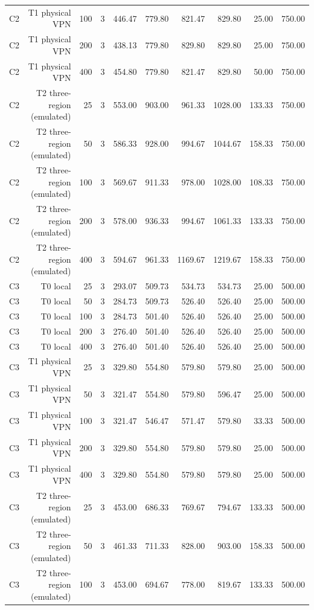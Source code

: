 \begin{table}[t]
\begin{tabular}{lrrrrrrrrr}
C2 & T1 physical VPN & 100 & 3 & 446.47 & 779.80 & 821.47 & 829.80 & 25.00 & 750.00 \\
C2 & T1 physical VPN & 200 & 3 & 438.13 & 779.80 & 829.80 & 829.80 & 25.00 & 750.00 \\
C2 & T1 physical VPN & 400 & 3 & 454.80 & 779.80 & 821.47 & 829.80 & 50.00 & 750.00 \\
C2 & T2 three-region (emulated) & 25 & 3 & 553.00 & 903.00 & 961.33 & 1028.00 & 133.33 & 750.00 \\
C2 & T2 three-region (emulated) & 50 & 3 & 586.33 & 928.00 & 994.67 & 1044.67 & 158.33 & 750.00 \\
C2 & T2 three-region (emulated) & 100 & 3 & 569.67 & 911.33 & 978.00 & 1028.00 & 108.33 & 750.00 \\
C2 & T2 three-region (emulated) & 200 & 3 & 578.00 & 936.33 & 994.67 & 1061.33 & 133.33 & 750.00 \\
C2 & T2 three-region (emulated) & 400 & 3 & 594.67 & 961.33 & 1169.67 & 1219.67 & 158.33 & 750.00 \\
C3 & T0 local & 25 & 3 & 293.07 & 509.73 & 534.73 & 534.73 & 25.00 & 500.00 \\
C3 & T0 local & 50 & 3 & 284.73 & 509.73 & 526.40 & 526.40 & 25.00 & 500.00 \\
C3 & T0 local & 100 & 3 & 284.73 & 501.40 & 526.40 & 526.40 & 25.00 & 500.00 \\
C3 & T0 local & 200 & 3 & 276.40 & 501.40 & 526.40 & 526.40 & 25.00 & 500.00 \\
C3 & T0 local & 400 & 3 & 276.40 & 501.40 & 526.40 & 526.40 & 25.00 & 500.00 \\
C3 & T1 physical VPN & 25 & 3 & 329.80 & 554.80 & 579.80 & 579.80 & 25.00 & 500.00 \\
C3 & T1 physical VPN & 50 & 3 & 321.47 & 554.80 & 579.80 & 596.47 & 25.00 & 500.00 \\
C3 & T1 physical VPN & 100 & 3 & 321.47 & 546.47 & 571.47 & 579.80 & 33.33 & 500.00 \\
C3 & T1 physical VPN & 200 & 3 & 329.80 & 554.80 & 579.80 & 579.80 & 25.00 & 500.00 \\
C3 & T1 physical VPN & 400 & 3 & 329.80 & 554.80 & 579.80 & 579.80 & 25.00 & 500.00 \\
C3 & T2 three-region (emulated) & 25 & 3 & 453.00 & 686.33 & 769.67 & 794.67 & 133.33 & 500.00 \\
C3 & T2 three-region (emulated) & 50 & 3 & 461.33 & 711.33 & 828.00 & 903.00 & 158.33 & 500.00 \\
C3 & T2 three-region (emulated) & 100 & 3 & 453.00 & 694.67 & 778.00 & 819.67 & 133.33 & 500.00 \\

\end{tabular}
\end{table}
